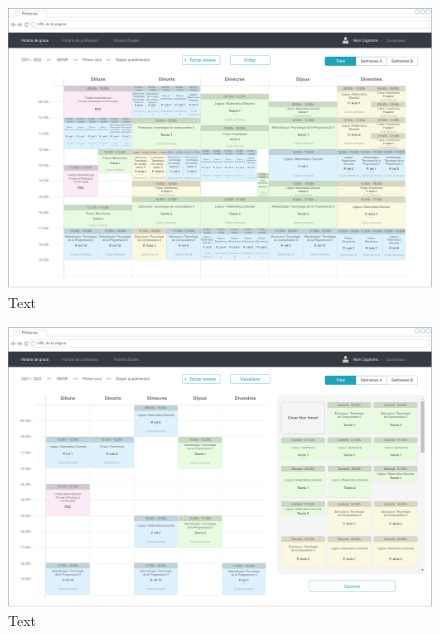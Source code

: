 \documentclass[a4paper,12pt]{ThesisStyle}
\begin{document}
\begin{figure}[H]
	\centering
	\includegraphics[width=\textwidth]{assets/interfaces/coordinadors/horarisGraus/visualitzacio.pdf}
	\caption{\label{img:horarisGraus_visualitzacio}Text}
\end{figure}

\begin{figure}[H]
	\centering
	\includegraphics[width=\textwidth]{assets/interfaces/coordinadors/horarisGraus/edicio.pdf}
	\caption{\label{img:horarisGraus_edicio}Text}
\end{figure}
\end{document}
